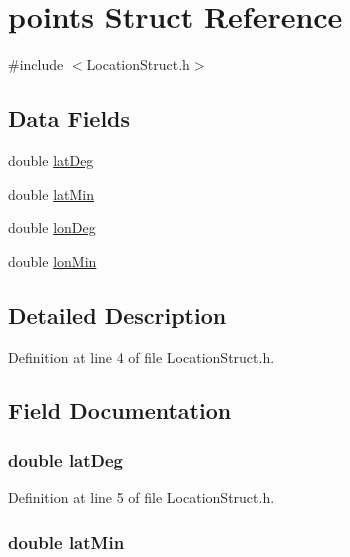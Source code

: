 \hypertarget{structpoints}{
\section{points \-Struct \-Reference}
\label{structpoints}
}


{\ttfamily \#include $<$\-Location\-Struct.\-h$>$}

\subsection*{\-Data \-Fields}
\begin{DoxyCompactItemize}
\item 
double \hyperlink{structpoints_a08f58fb014591a03cef3747723397dab}{lat\-Deg}
\item 
double \hyperlink{structpoints_ae91da8d14518e615ceaae957260204ba}{lat\-Min}
\item 
double \hyperlink{structpoints_aa9d469451b350f942a352bf3a813fe81}{lon\-Deg}
\item 
double \hyperlink{structpoints_a1122975e5c72c0ad3044620006a92ee5}{lon\-Min}
\end{DoxyCompactItemize}


\subsection{\-Detailed \-Description}


\-Definition at line 4 of file \-Location\-Struct.\-h.



\subsection{\-Field \-Documentation}
\hypertarget{structpoints_a08f58fb014591a03cef3747723397dab}{
\subsubsection[{lat\-Deg}]{\setlength{\rightskip}{0pt plus 5cm}double {\bf lat\-Deg}}}
\label{structpoints_a08f58fb014591a03cef3747723397dab}


\-Definition at line 5 of file \-Location\-Struct.\-h.

\hypertarget{structpoints_ae91da8d14518e615ceaae957260204ba}{
\subsubsection[{lat\-Min}]{\setlength{\rightskip}{0pt plus 5cm}double {\bf lat\-Min}}}
\label{structpoints_ae91da8d14518e615ceaae957260204ba}


